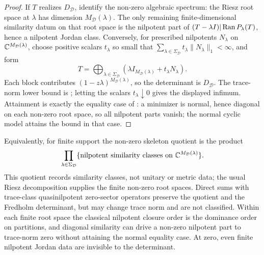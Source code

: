 \begin{proof}
  If \(T\) realizes \(D_{\mathcal D}\),
  identify the non-zero algebraic spectrum: the Riesz root space at
  \(\lambda\) has dimension \(M_{\mathcal D}(\lambda)\).  The only remaining
  finite-dimensional similarity datum on that root space is the nilpotent part
  of \((T-\lambda I)|\operatorname{Ran} P_\lambda(T)\), hence a nilpotent Jordan class.
  Conversely, for prescribed nilpotents \(N_\lambda\) on
  \(\mathbb{C}^{M_{\mathcal D}(\lambda)}\), choose positive scalars \(t_\lambda\) so
  small that
  \(\sum_{\lambda\in\Sigma_{\mathcal D}}t_\lambda\|N_\lambda\|_1<\infty\), and
  form
  \[
    T=\bigoplus_{\lambda\in\Sigma_{\mathcal D}}
      (\lambda I_{M_{\mathcal D}(\lambda)}+t_\lambda N_\lambda).
  \]
  Each block contributes \((1-z\lambda)^{M_{\mathcal D}(\lambda)}\), so the
  determinant is \(D_{\mathcal D}\).  The trace-norm lower bound is
  ; letting the scalars
  \(t_\lambda\downarrow0\) gives the displayed infimum.  Attainment is exactly
  the equality case of : a
  minimizer is normal, hence diagonal on each non-zero root space, so all
  nilpotent parts vanish; the normal cyclic model attains the bound in that
  case.
\end{proof}

\begin{remark}
  Equivalently, for finite support the non-zero skeleton quotient is the product
  \[
    \prod_{\lambda\in\Sigma_{\mathcal D}}
      \{\text{nilpotent similarity classes on }
        \mathbb{C}^{M_{\mathcal D}(\lambda)}\}.
  \]
  This quotient records similarity classes, not unitary or metric data; the
  usual Riesz decomposition supplies the finite non-zero root spaces.  Direct
  sums with trace-class quasinilpotent zero-sector operators preserve the
  quotient and the Fredholm determinant, but may change trace norm and are not
  classified.  Within each finite root space the classical nilpotent closure
  order is the dominance order on partitions, and diagonal similarity can drive
  a non-zero nilpotent part to trace-norm zero without attaining the normal
  equality case.  At zero, even finite nilpotent Jordan data are invisible to
  the determinant.
\end{remark}
